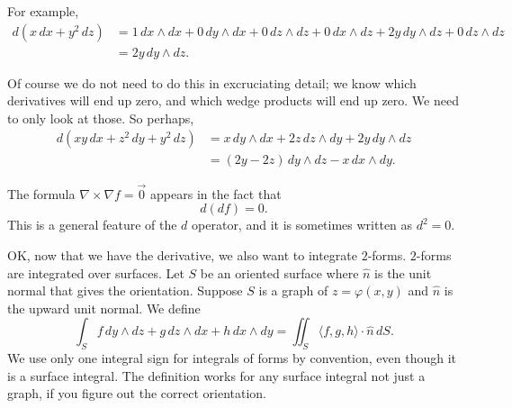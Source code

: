 \documentclass[12pt]{article}
\begin{document}
For example,
\[
\begin{split}
d( x \, dx + y^2 \, dz)
& = 
1 \, dx \wedge dx + 0 \, dy \wedge dx + 0 \, dz \wedge dz
+
0 \, dx \wedge dz + 2y \, dy \wedge dz + 0 \, dz \wedge dz
\\
& =
2 y \, dy \wedge dz .
\end{split}
\]

Of course we do not need to do this in excruciating detail;
we know which derivatives will end up zero,
and which wedge products will end up zero.  We need to only look at those.
So perhaps,
\[
\begin{split}
d( xy \, dx + z^2 \,dy + y^2 \, dz)
& =
x \, dy \wedge dx
+
2z \, dz \wedge dy
+
2y \, dy \wedge dz
\\
& =
(2y -2z ) \, dy \wedge dz
- x \, dx \wedge dy .
\end{split}
\]

The formula $\nabla \times \nabla f = \vec{0}$ appears in the fact that
\[
d(df) = 0 .
\]
This is a general feature of the $d$ operator, and it is sometimes
written as $d^2 = 0$.

OK, now that we have the derivative, we also want to integrate $2$-forms.
$2$-forms are integrated over surfaces.  Let $S$ be an oriented surface
where $\hat{n}$ is the unit normal that gives the orientation.
Suppose $S$ is a graph of $z = \varphi(x,y)$ and $\hat{n}$ is the upward unit normal.
We define
\[
\int_S
f\, dy \wedge dz + 
g\, dz \wedge dx +
h\, dx \wedge dy
=
\iint_S \langle f, g, h \rangle \cdot \hat{n} \, dS .
\]
We use only one integral sign for integrals of forms by convention,
even though it is a surface integral.
The definition works for any surface integral not just a graph,
if you figure out the correct orientation.
\end{document}
